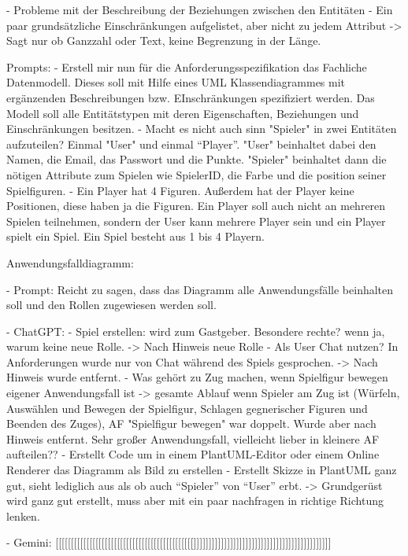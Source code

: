     - Probleme mit der Beschreibung der Beziehungen zwischen den Entitäten
    - Ein paar grundsätzliche Einschränkungen aufgelistet, aber nicht zu jedem Attribut -> Sagt nur ob Ganzzahl oder Text,
    keine Begrenzung in der Länge.

    Prompts:
        - Erstell mir nun für die Anforderungsspezifikation das Fachliche Datenmodell. Dieses soll mit Hilfe eines UML Klassendiagrammes mit ergänzenden Beschreibungen bzw. EInschränkungen spezifiziert werden. Das Modell soll alle Entitätstypen mit deren Eigenschaften, Beziehungen und Einschränkungen besitzen.
        - Macht es nicht auch sinn "Spieler" in zwei Entitäten aufzuteilen? Einmal "User" und einmal ``Player''.  "User" beinhaltet dabei den Namen, die Email, das Passwort und die Punkte. "Spieler" beinhaltet dann die nötigen Attribute zum Spielen wie SpielerID, die Farbe und die position seiner Spielfiguren.
        - Ein Player hat 4 Figuren. Außerdem hat der Player keine Positionen, diese haben ja die Figuren. Ein Player soll auch nicht an mehreren Spielen teilnehmen, sondern der User kann mehrere Player sein und ein Player spielt ein Spiel. Ein Spiel besteht aus 1 bis 4 Playern.


Anwendungsfalldiagramm:

- Prompt: Reicht zu sagen, dass das Diagramm alle Anwendungsfälle beinhalten soll und den Rollen zugewiesen werden soll.

- ChatGPT:
    - Spiel erstellen: wird zum Gastgeber. Besondere rechte? wenn ja, warum keine neue Rolle. -> Nach Hinweis neue Rolle
    - Als User Chat nutzen? In Anforderungen wurde nur von Chat während des Spiels gesprochen. -> Nach Hinweis wurde entfernt.
    - Was gehört zu Zug machen, wenn Spielfigur bewegen eigener Anwendungsfall ist -> gesamte Ablauf wenn Spieler am Zug ist
    (Würfeln, Auswählen und Bewegen der Spielfigur, Schlagen gegnerischer Figuren und Beenden des Zuges), AF "Spielfigur bewegen" 
    war doppelt. Wurde aber nach Hinweis entfernt. Sehr großer Anwendungsfall, vielleicht lieber in kleinere AF aufteilen??
    - Erstellt Code um in einem PlantUML-Editor oder einem Online Renderer das Diagramm als Bild zu erstellen
    - Erstellt Skizze in PlantUML ganz gut, sieht lediglich aus als ob auch ``Spieler'' von ``User'' erbt.
    -> Grundgerüst wird ganz gut erstellt, muss aber mit ein paar nachfragen in richtige Richtung lenken.

- Gemini: [[[[[[[[[[[[[[[[[[[[[[[[[[[[[[[[[[[[[[[[[[[[[]]]]]]]]]]]]]]]]]]]]]]]]]]]]]]]]]]]]]]]]]]]]]

